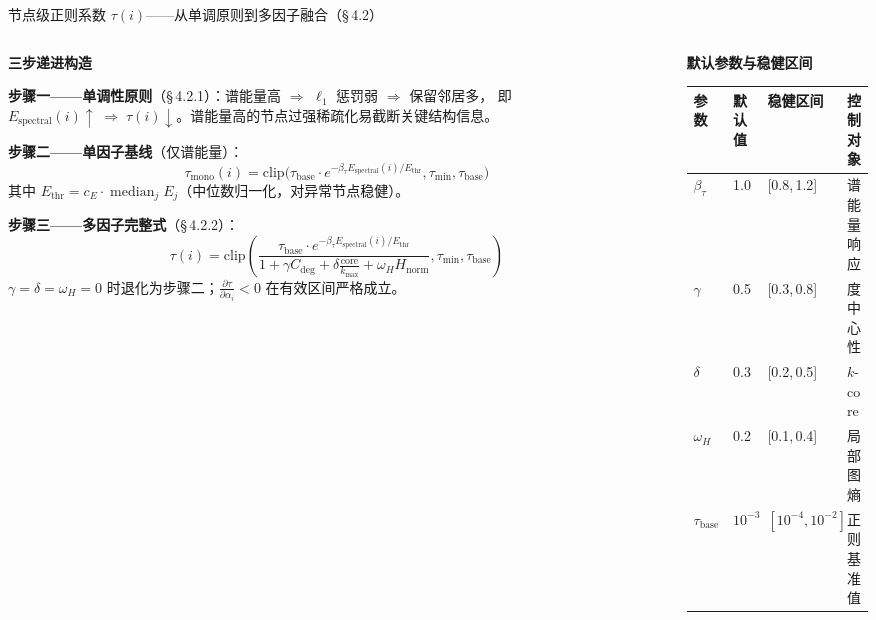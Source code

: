 \documentclass[aspectratio=169,9pt,xcolor=dvipsnames]{beamer}
\newcommand{\blue}[1]{\textcolor{mynavy}{#1}}
\begin{document}
\begin{frame}{节点级正则系数 $\tau(i)$——从单调原则到多因子融合（§\,4.2）}
\begin{columns}[T]

\begin{column}{0.50\textwidth}
  
  \textbf{\blue{三步递进构造}}

  \vspace{0.2cm}

  \textbf{步骤一——单调性原则}（§\,4.2.1）：谱能量高 $\Rightarrow$ $\ell_1$ 惩罚弱 $\Rightarrow$ 保留邻居多，
  即 $E_{\mathrm{spectral}}(i)\uparrow\;\Rightarrow\;\tau(i)\downarrow$。谱能量高的节点过强稀疏化易截断关键结构信息。
  \vspace{0.2cm}

  \textbf{步骤二——单因子基线}（仅谱能量）：
  \begin{equation*}
    \tau_{\mathrm{mono}}(i)=\mathrm{clip}\!\bigl(
    \tau_{\mathrm{base}}\cdot e^{-\beta_\tau E_{\mathrm{spectral}}(i)/E_{\mathrm{thr}}},
    \tau_{\min},\tau_{\mathrm{base}}\bigr)
  \end{equation*}
  其中 $E_{\mathrm{thr}}=c_E\cdot\operatorname{median}_j E_j$（中位数归一化，对异常节点稳健）。
  \vspace{0.2cm}

  \textbf{步骤三——多因子完整式}（§\,4.2.2）：
  \begin{equation*}
    \tau(i)=\mathrm{clip}\!\left(
    \frac{\tau_{\mathrm{base}}\cdot e^{-\beta_\tau E_{\mathrm{spectral}}(i)/E_{\mathrm{thr}}}}
         {1+\gamma C_{\mathrm{deg}}+\delta\frac{\mathrm{core}}{k_{\max}}+\omega_H H_{\mathrm{norm}}},
    \tau_{\min},\tau_{\mathrm{base}}\right)
  \end{equation*}
  $\gamma=\delta=\omega_H=0$ 时退化为步骤二；$\frac{\partial\tau}{\partial\alpha_i}<0$ 在有效区间严格成立。
  
\end{column}

\begin{column}{0.47\textwidth}
  \textbf{\blue{默认参数与稳健区间}}

  \vspace{0.05cm}
  \begin{tabular}{m{1cm}m{1cm}m{1.5cm}m{1.7cm}}
    \toprule
    参数 & 默认值 & 稳健区间 & 控制对象 \\
    \midrule
    $\beta_\tau$ & 1.0 & [0.8,\,1.2] & 谱能量响应 \\
    $\gamma$ & 0.5 & [0.3,\,0.8] & 度中心性 \\
    $\delta$ & 0.3 & [0.2,\,0.5] & $k$-core \\
    $\omega_H$ & 0.2 & [0.1,\,0.4] & 局部图熵 \\
    $\tau_{\mathrm{base}}$ & $10^{-3}$ & $[10^{-4},10^{-2}]$ & 正则基准值 \\
    \bottomrule
  \end{tabular}


\end{column}
\end{columns}
\end{frame}
\end{document}
